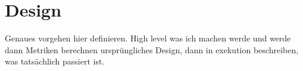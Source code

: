 \section{Design}
\label{chp:study:sec:design}

Genaues vorgehen hier definieren.
High level was ich machen werde und werde dann Metriken berechnen
ursprüngliches Design, dann in exekution beschreiben, was tatsächlich passiert ist.

